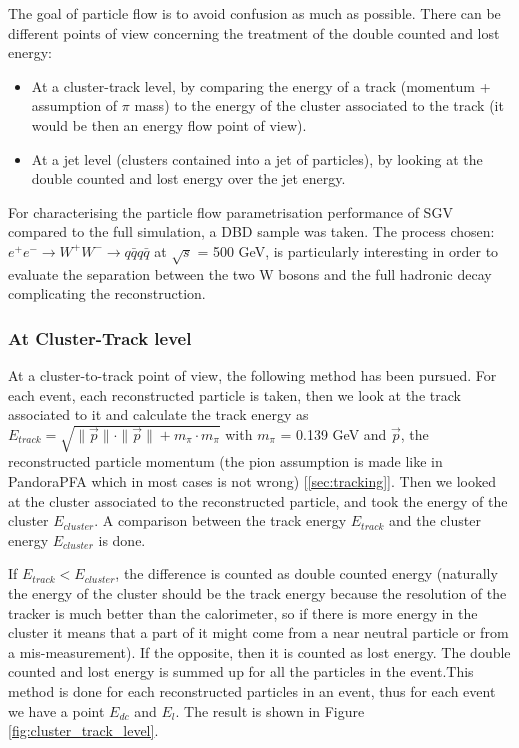 The goal of particle flow is to avoid confusion as much as possible. There can be different points of view concerning the treatment of the double counted and lost energy:
\begin{itemize}
  \item At a cluster-track level, by comparing the energy of a track (momentum + assumption of $\pi$ mass) to the energy of the cluster associated to the track (it would be then an energy flow point of view).
  \item At a jet level (clusters contained into a jet of particles), by looking at the double counted and lost energy over the jet energy.
\end{itemize}

For characterising the particle flow parametrisation performance of SGV compared to the full simulation, a DBD sample was taken. The process chosen: $e^+e^- \rightarrow W^+W^- \rightarrow q\bar{q} q\bar{q}$ at $\sqrt{s}$ = 500 GeV, is particularly interesting in order to evaluate the separation between the two W bosons and the full hadronic decay complicating the reconstruction.

\subsubsection{At Cluster-Track level}

At a cluster-to-track point of view, the following method has been pursued. For each event, each reconstructed particle is taken, then we look at the track associated to it and calculate the track energy as $E_{track} = \sqrt{\|\overrightarrow{p}\| \cdot \|\overrightarrow{p}\| + m_{\pi} \cdot m_{\pi}}$ with $m_{\pi}$ = 0.139 GeV and $\overrightarrow{p}$, the reconstructed particle momentum (the pion assumption is made like in PandoraPFA which in most cases is not wrong) [\ref{sec:tracking}]. Then we looked at the cluster associated to the reconstructed particle, and took the energy of the cluster $E_{cluster}$. A comparison between the track energy $E_{track}$ and the cluster energy $E_{cluster}$ is done.

If $E_{track} < E_{cluster}$, the difference is counted as double counted energy (naturally the energy of the cluster should be the track energy because the resolution of the tracker is much better than the calorimeter, so if there is more energy in the cluster it means that a part of it might come from a near neutral particle or from a mis-measurement). If the opposite, then it is counted as lost energy. The double counted and lost energy is summed up for all the particles in the event.This method is done for each reconstructed particles in an event, thus for each event we have a point $E_{dc}$ and $E_{l}$. The result is shown in Figure \ref{fig:cluster_track_level}.

